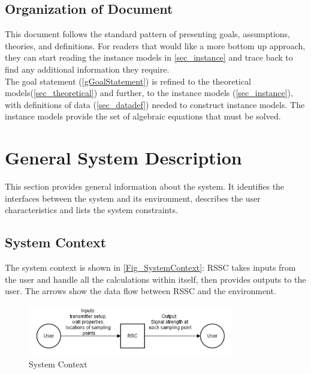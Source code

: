 \documentclass[12pt]{article}
\begin{document}
\subsection{Organization of Document}
This document follows the standard pattern of presenting goals, assumptions, theories, and definitions. For readers that would like a more bottom up approach, they can start reading 
the instance models in \ref{sec_instance} and trace back to find any additional 
information they require.\\

The goal statement (\ref{gGoalStatement}) is refined to the theoretical models(\ref{sec_theoretical}) and further, to the instance models (\autoref{sec_instance}),
with definitions of data (\ref{sec_datadef}) needed to construct instance models.
The instance models provide the set of algebraic equations that must be solved.
 


\section{General System Description}

This section provides general information about the system.  It identifies the
interfaces between the system and its environment, describes the user
characteristics and lists the system constraints.

\subsection{System Context}

The system context is shown in \autoref{Fig_SystemContext}: RSSC takes inputs from
the user and handle all the calculations within itself, then provides outputs to 
the user. The arrows show the data flow between RSSC and the environment.

\begin{figure}[h!]
\begin{center}
 \includegraphics[width=0.8\textwidth]{Untitled}
\caption{System Context}
\label{Fig_SystemContext} 
\end{center}
\end{figure}
\end{document}
